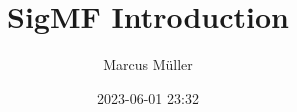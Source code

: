 %
\newcommand{\GR}{GNU\,Radio}
\date{2023-06-01 23:32}
\title{SigMF Introduction}
\author{Marcus Müller}
